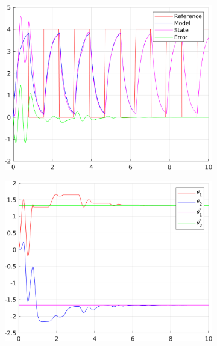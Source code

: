 \documentclass[12pt,a4paper]{article}
\begin{document}
		\begin{figure}[H]
			\centering
			\begin{subfigure}{.45\textwidth}
				\centering
				\includegraphics[width=1\textwidth]{Graphics/LinearState3.png}
			\end{subfigure}%
			\begin{subfigure}{.45\textwidth}
				\centering
				\includegraphics[width=1\textwidth]{Graphics/LinearParameters3.png}
			\end{subfigure}
			\begin{subfigure}{.45\textwidth}
				\centering

\end{subfigure}
\end{figure}
\end{document}
